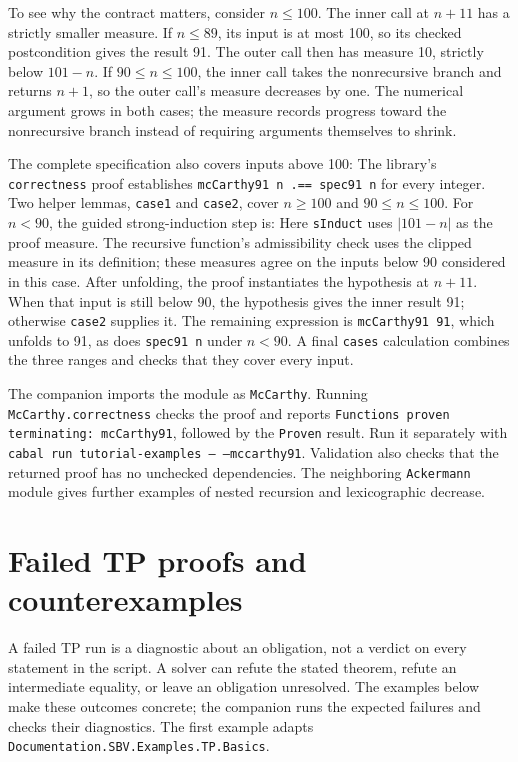 \documentclass[review]{jfp-epi}
\newcommand{\code}[1]{\texttt{#1}}
\begin{document}
To see why the contract matters, consider $n\leq100$. The inner call at
$n+11$ has a strictly smaller measure. If $n\leq89$, its input is at most
100, so its checked postcondition gives the result 91. The outer call then
has measure 10, strictly below $101-n$. If $90\leq n\leq100$, the inner
call takes the nonrecursive branch and returns $n+1$, so the outer call's
measure decreases by one. The numerical argument grows in both cases; the
measure records progress toward the nonrecursive branch instead of requiring
arguments themselves to shrink.

The complete specification also covers inputs above 100:
The library's \code{correctness} proof establishes
\code{mcCarthy91 n .== spec91 n} for every integer. Two helper lemmas,
\code{case1} and \code{case2}, cover $n\geq100$ and $90\leq n\leq100$.
For $n<90$, the guided strong-induction step is:
Here \code{sInduct} uses $|101-n|$ as the proof measure. The recursive
function's admissibility check uses the clipped measure in its definition;
these measures agree on the inputs below 90 considered in this case.
After unfolding, the proof instantiates the hypothesis at $n+11$.
When that input is still below 90, the hypothesis gives the inner result 91;
otherwise \code{case2} supplies it. The remaining expression is
\code{mcCarthy91 91}, which unfolds to 91, as does \code{spec91 n} under
$n<90$. A final \code{cases} calculation combines the three ranges and checks
that they cover every input.

The companion imports the module as \code{McCarthy}. Running
\code{McCarthy.correctness} checks the proof and reports
\code{Functions proven terminating: mcCarthy91}, followed by the
\code{Proven} result. Run it separately with
\code{cabal run tutorial-examples -- --mccarthy91}. Validation also checks that
the returned proof has no unchecked dependencies. The neighboring
\code{Ackermann} module gives further examples of nested recursion and
lexicographic decrease.


\section{Failed TP proofs and counterexamples}
\label{sec:tp-failures}

A failed TP run is a diagnostic about an obligation, not a verdict on every
statement in the script. A solver can refute the stated theorem, refute an
intermediate equality, or leave an obligation unresolved. The examples below
make these outcomes concrete; the companion runs the expected failures and
checks their diagnostics. The first example adapts
\code{Documentation.SBV.Examples.TP.Basics}.
\end{document}
